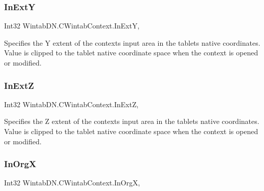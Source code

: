 \mbox{\label{class_wintab_d_n_1_1_c_wintab_context_abb73e61691a4b2480b7997b73202b63b}} 
\subsubsection{\texorpdfstring{In\+ExtY}{InExtY}}
{\footnotesize\ttfamily Int32 Wintab\+D\+N.\+C\+Wintab\+Context.\+In\+ExtY\hspace{0.3cm}{\ttfamily [get]}, {\ttfamily [set]}}



Specifies the Y extent of the context\textquotesingle{}s input area in the tablet\textquotesingle{}s native coordinates. Value is clipped to the tablet native coordinate space when the context is opened or modified. 

\mbox{\label{class_wintab_d_n_1_1_c_wintab_context_a8d699ca76769679eca827b033e4f5fde}} 
\subsubsection{\texorpdfstring{In\+ExtZ}{InExtZ}}
{\footnotesize\ttfamily Int32 Wintab\+D\+N.\+C\+Wintab\+Context.\+In\+ExtZ\hspace{0.3cm}{\ttfamily [get]}, {\ttfamily [set]}}



Specifies the Z extent of the context\textquotesingle{}s input area in the tablet\textquotesingle{}s native coordinates. Value is clipped to the tablet native coordinate space when the context is opened or modified. 

\mbox{\label{class_wintab_d_n_1_1_c_wintab_context_a326fb62231cb2f9b783cb29a6716b6b7}} 
\subsubsection{\texorpdfstring{In\+OrgX}{InOrgX}}
{\footnotesize\ttfamily Int32 Wintab\+D\+N.\+C\+Wintab\+Context.\+In\+OrgX\hspace{0.3cm}{\ttfamily [get]}, {\ttfamily [set]}}



